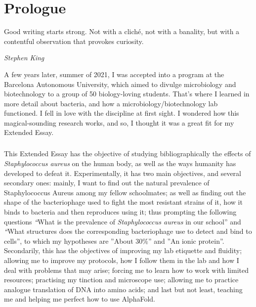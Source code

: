 \chapter{Prologue}
\epigraph{Good writing starts strong. Not with a cliché, not with a banality, but with a contentful observation that provokes curiosity.}{\textit{Stephen King}}
A few years later, summer of 2021, I was accepted into a program at the Barcelona Autonomous University, which aimed to divulge microbiology and biotechnology to a group of 50 biology-loving students. That's where I learned in more detail about bacteria, and how a microbiology/biotechnology lab functioned. I fell in love with the discipline at first sight. I wondered how this magical-sounding research works, and so, I thought it was a great fit for my Extended Essay.

\paragraph{}This Extended Essay has the objective of studying bibliographically the effects of \emph{Staphylococcus aureus} on the human body, as well as the ways humanity has developed to defeat it. Experimentally, it has two main objectives, and several secondary ones: mainly, I want to find out the natural prevalence of Staphylococcus Aureus among my fellow schoolmates; as well as finding out the shape of the bacteriophage used to fight the most resistant strains of it, how it binds to bacteria and then reproduces using it; thus prompting the following questions \emph“What is the prevalence of \emph{Staphylococcus aureus} in our school” and \emph“What structures does the corresponding bacteriophage use to detect and bind to cells”, to which my hypotheses are ”About 30\%” and ”An ionic protein”. Secondarily, this has the objectives of improving my lab etiquette and fluidity; allowing me to improve my protocols, how I follow them in the lab and how I deal with problems that may arise; forcing me to learn how to work with limited resources; practising my tinction and microscope use; allowing me to practice analogue translation of DNA into amino acids; and last but not least, teaching me and helping me perfect how to use AlphaFold.

